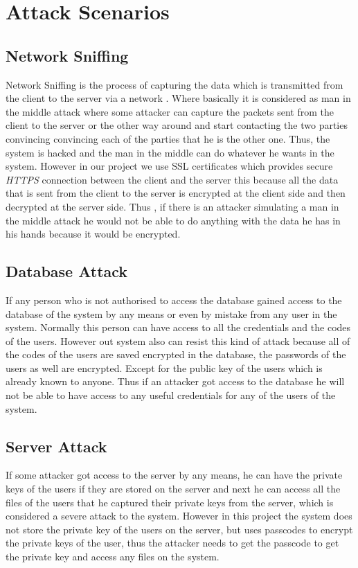 \chapter{Attack Scenarios}

\section{Network Sniffing}
Network Sniffing is the process of capturing the data which is transmitted from the client to the server via a network . Where basically it is considered as man in the middle attack where some attacker can capture the packets sent from the client to the server or the other way around and start contacting the two parties convincing convincing each of the parties that he is the other one. Thus, the system is hacked and the man in the middle can do whatever he wants in the system. However in our project we use SSL certificates which provides secure \textit{HTTPS} connection between the client and the server this because all the data that is sent from the client to the server is encrypted at the client side and then decrypted at the server side. Thus , if there is an attacker simulating a man in the middle attack he would not be able to do anything with the data he has in his hands because it would be encrypted.

\section{Database Attack}
If any person who is not authorised to access the database gained access to the database of the system by any means or even by mistake from any user in the system. Normally this person can have access to all the credentials and the codes of the users.
However out system also can resist this kind of attack because all of the codes of the users are saved encrypted in the database, the passwords of the users as well are encrypted. Except for the public key of the users which is already known to anyone. Thus if an attacker got access to the database he will not be able to have access to any useful credentials for any of the users of the system.

\section{Server Attack}
If some attacker got access to the server by any means, he can have the private keys of the users if they are stored on the server and next he can access all the files of the users that he captured their private keys from the server, which is considered a severe attack to the system. However in this project the system does not store the private key of the users on the server, but uses passcodes to encrypt the private keys of the user, thus the attacker needs to get the passcode to get the private key and access any files on the system.